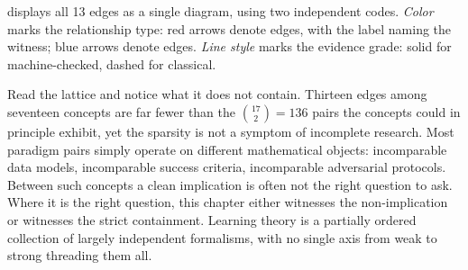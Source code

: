  displays all 13 edges as a single
diagram, using two independent codes. \emph{Color} marks the
relationship type: red arrows denote  edges, with
the label naming the witness; blue arrows denote 
edges. \emph{Line style} marks the evidence grade: solid for
machine-checked, dashed for classical.

Read the lattice and notice what it does not contain. Thirteen edges
among seventeen concepts are far fewer than the $\binom{17}{2} = 136$
pairs the concepts could in principle exhibit, yet the sparsity is not
a symptom of incomplete research. Most paradigm pairs simply operate on
different mathematical objects: incomparable data models, incomparable
success criteria, incomparable adversarial protocols. Between such
concepts a clean implication is often not the right question to ask.
Where it is the right question, this chapter either witnesses the
non-implication or witnesses the strict containment. Learning theory
is a partially ordered collection of largely independent formalisms,
with no single axis from weak to strong threading them all.

